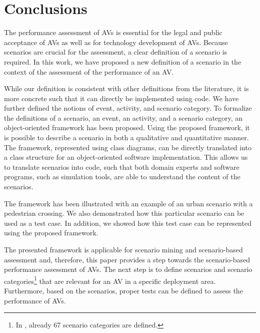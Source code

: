 \section{Conclusions}
\label{sec:conclusion}

The performance assessment of AVs is essential for the legal and public acceptance of AVs as well as for technology development of AVs. 
Because scenarios are crucial for the assessment, a clear definition of a scenario is required.
In this work, we have proposed a new definition of a scenario in the context of the assessment of the performance of an AV. 
 
While our definition is consistent with other definitions from the literature, it is more concrete such that it can directly be implemented using code.
We have further defined the notions of event, activity, and scenario category. 
To formalize the definitions of a scenario, an event, an activity, and a scenario category, an \cstartb object-oriented framework \cendb has been proposed. Using the proposed \cstartb framework\cendb, it is possible to describe a scenario in both a qualitative and quantitative manner. The \cstartb framework\cendb, represented using \cstartb class diagrams\cendb, can be directly translated into a class structure for an object-oriented software implementation. This allows us to translate scenarios into code, such that both domain experts and software programs, such as simulation tools, are able to understand the content of the scenarios. 

The \cstartb framework \cendb has been illustrated with an example of an urban scenario with a pedestrian crossing. 
We also demonstrated how this particular scenario can be used as a test case. In addition, we showed how this test case can be represented using the proposed \cstartb framework\cendb.

The presented \cstartb framework \cendb is applicable for scenario mining \autocite{paardekooper2019dataset6000km} and scenario-based assessment \autocite{elrofai2018scenario} and, therefore, this paper provides a step towards the scenario-based performance assessment of AVs. The next step is to define scenarios and scenario categories\footnote{In \autocite{degelder2019scenariocategories}, already 67 scenario categories are defined.} that are relevant for an AV in a specific deployment area. Furthermore, based on the scenarios, proper tests can be defined to assess the performance of AVs. 

